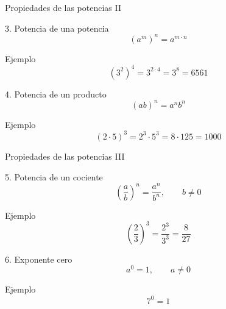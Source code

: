 \documentclass[aspectratio=169,10pt,handout]{beamer}
\newcommand{\pp}{\pause}
\begin{document}
	\begin{frame}{Propiedades de las potencias II}
		\begin{block}{3. Potencia de una potencia}
			\[
			(a^m)^n = a^{m\cdot n}
			\]
		\end{block}
		
		\begin{exampleblock}{Ejemplo}
			\[
			(3^2)^4 = 3^{2\cdot4}=3^8=6561
			\]
		\end{exampleblock}
		
		\pp
		
		\begin{block}{4. Potencia de un producto}
			\[
			(ab)^n = a^n b^n
			\]
		\end{block}
		
		\begin{exampleblock}{Ejemplo}
			\[
			(2\cdot5)^3 = 2^3\cdot5^3 = 8\cdot125 = 1000
			\]
		\end{exampleblock}
	\end{frame}
	
	\begin{frame}{Propiedades de las potencias III}
		\begin{block}{5. Potencia de un cociente}
			\[
			\left(\frac{a}{b}\right)^n = \frac{a^n}{b^n}, \qquad b\neq 0
			\]
		\end{block}
		
		\begin{exampleblock}{Ejemplo}
			\[
			\left(\frac{2}{3}\right)^3 = \frac{2^3}{3^3}=\frac{8}{27}
			\]
		\end{exampleblock}
		
		\pp
		
		\begin{block}{6. Exponente cero}
			\[
			a^0 = 1, \qquad a\neq 0
			\]
		\end{block}
		
		\begin{exampleblock}{Ejemplo}
			\[
			7^0 = 1
			\]
		\end{exampleblock}
	\end{frame}
	
\end{document}
